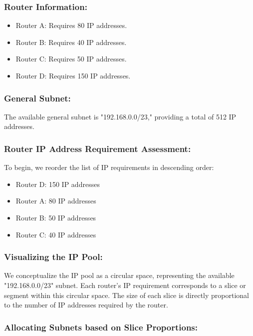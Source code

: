 \subsubsection{Router Information:}
\begin{itemize}
  \item Router A: Requires 80 IP addresses.
  \item Router B: Requires 40 IP addresses.
  \item Router C: Requires 50 IP addresses.
  \item Router D: Requires 150 IP addresses.
\end{itemize}

\subsubsection{General Subnet:}

The available general subnet is "192.168.0.0/23," providing a total of 512 IP addresses.

\subsubsection{Router IP Address Requirement Assessment:}

To begin, we reorder the list of IP requirements in descending order:
\begin{itemize}
  \item Router D: 150 IP addresses
  \item Router A: 80 IP addresses
  \item Router B: 50 IP addresses
  \item Router C: 40 IP addresses
\end{itemize}


\subsubsection{Visualizing the IP Pool:}

We conceptualize the IP pool as a circular space, representing the available "192.168.0.0/23" subnet. Each router's IP requirement corresponds to a slice or segment within this circular space. The size of each slice is directly proportional to the number of IP addresses required by the router.

\subsubsection{Allocating Subnets based on Slice Proportions:}

